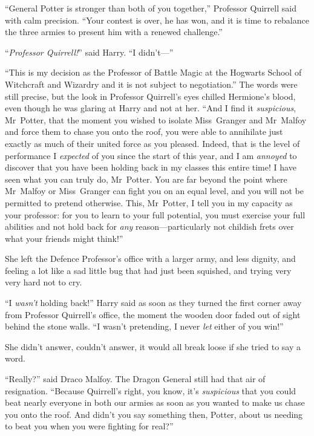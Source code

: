 “General Potter is stronger than both of you together,” Professor Quirrell said with calm precision.
“Your contest is over, he has won, and it is time to rebalance the three armies to present him with a renewed challenge.”

“\emph{Professor Quirrell!}” said Harry.
“I didn’t—”

“This is my decision as the Professor of Battle Magic at the Hogwarts School of Witchcraft and Wizardry and it is not subject to negotiation.” The words were still precise, but the look in Professor Quirrell’s eyes chilled Hermione’s blood, even though he was glaring at Harry and not at her.
“And I find it \emph{suspicious}, Mr~Potter, that the moment you wished to isolate Miss~Granger and Mr~Malfoy and force them to chase you onto the roof, you were able to annihilate just exactly as much of their united force as you pleased. Indeed, that is the level of performance I \emph{expected} of you since the start of this year, and I am \emph{annoyed} to discover that you have been holding back in my classes this entire time! I have seen what you can truly do, Mr~Potter. You are far beyond the point where Mr~Malfoy or Miss~Granger can fight you on an equal level, and you will not be permitted to pretend otherwise. This, Mr~Potter, I tell you in my capacity as your professor: for you to learn to your full potential, you must exercise your full abilities and not hold back for \emph{any} reason—particularly not childish frets over what your friends might think!”

\later

She left the Defence Professor’s office with a larger army, and less dignity, and feeling a lot like a sad little bug that had just been squished, and trying very very hard not to cry.

“I \emph{wasn’t} holding back!” Harry said as soon as they turned the first corner away from Professor Quirrell’s office, the moment the wooden door faded out of sight behind the stone walls.
“I wasn’t pretending, I never \emph{let} either of you win!”

She didn’t answer, couldn’t answer, it would all break loose if she tried to say a word.

“Really?” said Draco Malfoy. The Dragon General still had that air of resignation.
“Because Quirrell’s right, you know, it’s \emph{suspicious} that you could beat nearly everyone in both our armies as soon as you wanted to make us chase you onto the roof. And didn’t you say something then, Potter, about us needing to beat you when you were fighting for real?”

